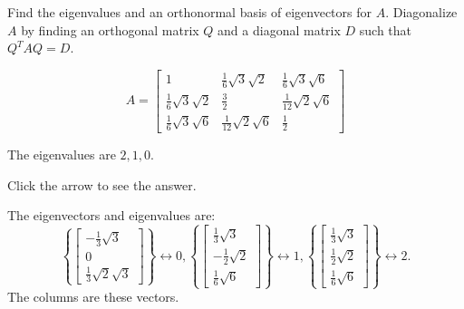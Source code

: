 \documentclass{ximera}
\begin{document}
 \begin{problem}\label{prb:9.10} Find the eigenvalues and an orthonormal basis of eigenvectors for $A.$
Diagonalize $A$ by finding an orthogonal matrix $Q$ and a diagonal matrix $D$
such that $Q^{T}AQ=D$.

\begin{equation*}
A=\left[
\begin{array}{ccc}
1 &  \frac{1}{6}\sqrt{3}\sqrt{2} &  \frac{1}{6}
\sqrt{3}\sqrt{6} \\
 \frac{1}{6}\sqrt{3}\sqrt{2} &  \frac{3}{2} &
 \frac{1}{12}\sqrt{2}\sqrt{6} \\
 \frac{1}{6}\sqrt{3}\sqrt{6} &  \frac{1}{12}
\sqrt{2}\sqrt{6} &  \frac{1}{2}
\end{array}
\right]
\end{equation*}

\begin{hint} 
The eigenvalues are $2,1,0.$

Click the arrow to see the answer. \begin{expandable}
The eigenvectors and eigenvalues are:
\[
\left\{ \left[
\begin{array}{c}
-\frac{1}{3}\sqrt{3} \\
0 \\
\frac{1}{3}\sqrt{2}\sqrt{3}
\end{array}
\right] \right\} \leftrightarrow 0,\left\{ \left[
\begin{array}{c}
\frac{1}{3}\sqrt{3} \\
-\frac{1}{2}\sqrt{2} \\
\frac{1}{6}\sqrt{6}
\end{array}
\right] \right\} \leftrightarrow 1,  \left\{ \left[
\begin{array}{c}
\frac{1}{3}\sqrt{3} \\
\frac{1}{2}\sqrt{2} \\
\frac{1}{6}\sqrt{6}
\end{array}
\right] \right\} \leftrightarrow 2.
\]
The columns are these vectors.
\end{expandable} \end{hint}
\end{problem}
\end{document}
